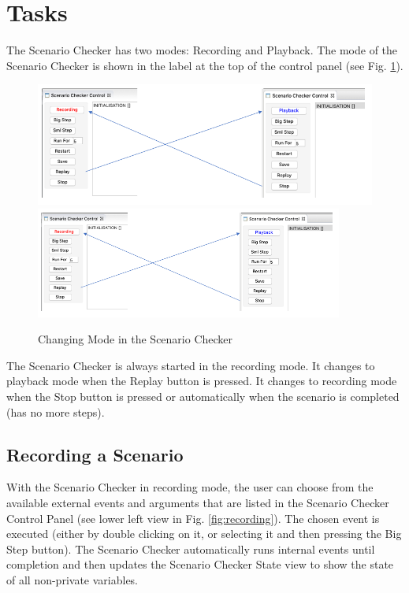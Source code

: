 \section{Tasks}
\label{sec:tasks}

The Scenario Checker has two modes: Recording and Playback. 
The mode of the Scenario Checker is shown in the label at the top of the control panel (see Fig. \ref{fig:changingMode}).

\begin{figure}[!htbp]
	\centering
	\ifplastex
	\includegraphics[width=768]{figures/changingMode}
	\else
	\includegraphics[width=0.9\textwidth]{figures/changingMode}
	\fi
	\caption{Changing Mode in the Scenario Checker}
	\label{fig:changingMode}
\end{figure}


The Scenario Checker is always started in the recording mode.
It changes to playback mode when the Replay button is pressed.
It changes to recording mode when the Stop button is pressed or automatically when the scenario is completed (has no more steps).

\subsection{Recording a Scenario}
\label{sec:recording}

With the Scenario Checker in recording mode, the user can choose from the available external events and arguments that are listed in the Scenario Checker Control Panel (see lower left view in Fig. \ref{fig:recording}). 
The chosen  event is executed (either by double clicking on it, or selecting it and then pressing the Big Step button).
The Scenario Checker automatically runs internal events until completion and then updates the Scenario Checker State view to show the state of all non-private variables.

